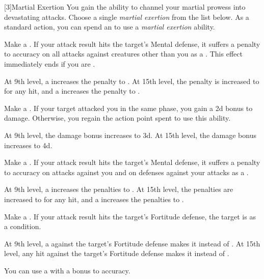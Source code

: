             [3]{Martial Exertion}
            You gain the ability to channel your martial prowess into devastating attacks.
            Choose a single \textit{martial exertion} from the list below.
            As a standard action, you can spend an  to use a \textit{martial exertion} ability.
            {
                 Make a .
                If your attack result hits the target's Mental defense, it suffers a  penalty to accuracy on all attacks against creatures other than you as a .
                This effect immediately ends if you are .

                At 9th level, a  increases the penalty to .
                At 15th level, the penalty is increased to  for any hit, and a  increases the penalty to .

                 Make a .
                If your target attacked you in the same phase, you gain a \plus2d bonus to damage.
                Otherwise, you regain the action point spent to use this ability.

                At 9th level, the damage bonus increases to \plus3d.
                At 15th level, the damage bonus increases to \plus4d.

                 Make a .
                If your attack result hits the target's Mental defense, it suffers a  penalty to accuracy on attacks against you and on defenses against your attacks as a .

                At 9th level, a  increases the penalties to .
                At 15th level, the penalties are increased to  for any hit, and a  increases the penalties to .

                 Make a .
                If your attack result hits the target's Fortitude defense, the target is \sickened as a condition.

                At 9th level, a  against the target's Fortitude defense makes it \nauseated instead of \sickened.
                At 15th level, any hit against the target's Fortitude defense makes it \nauseated instead of \sickened.

                 You can use a  with a  bonus to accuracy.

}
